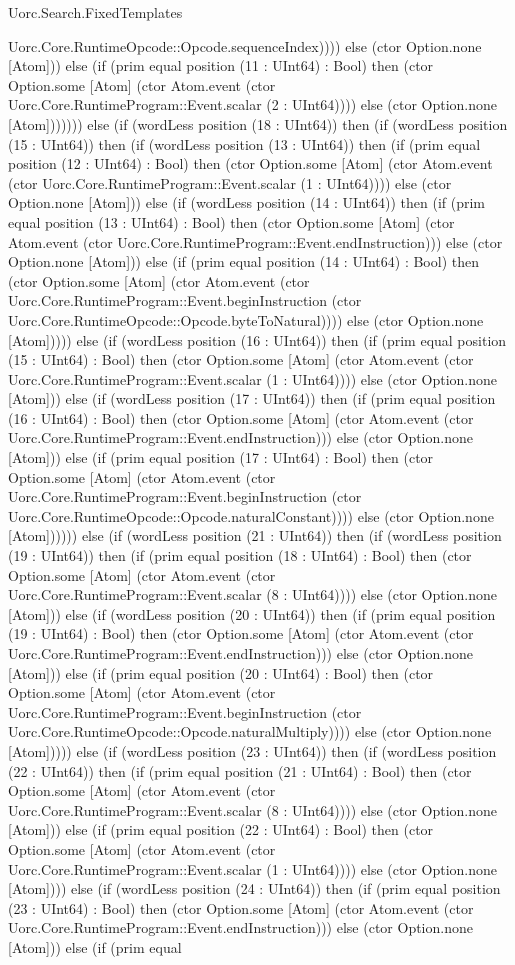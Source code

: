 \begin{lexlean}{Uorc.Search.FixedTemplates}
\begin{semanticmodule}
{Uorc.Core.RuntimeOpcode::Opcode.sequenceIndex)))) else (ctor Option.none [Atom])) else (if (prim equal position (11 : UInt64) : Bool) then (ctor Option.some [Atom] (ctor Atom.event (ctor Uorc.Core.RuntimeProgram::Event.scalar (2 : UInt64)))) else (ctor Option.none [Atom])))))) else (if (wordLess position (18 : UInt64)) then (if (wordLess position (15 : UInt64)) then (if (wordLess position (13 : UInt64)) then (if (prim equal position (12 : UInt64) : Bool) then (ctor Option.some [Atom] (ctor Atom.event (ctor Uorc.Core.RuntimeProgram::Event.scalar (1 : UInt64)))) else (ctor Option.none [Atom])) else (if (wordLess position (14 : UInt64)) then (if (prim equal position (13 : UInt64) : Bool) then (ctor Option.some [Atom] (ctor Atom.event (ctor Uorc.Core.RuntimeProgram::Event.endInstruction))) else (ctor Option.none [Atom])) else (if (prim equal position (14 : UInt64) : Bool) then (ctor Option.some [Atom] (ctor Atom.event (ctor Uorc.Core.RuntimeProgram::Event.beginInstruction (ctor Uorc.Core.RuntimeOpcode::Opcode.byteToNatural)))) else (ctor Option.none [Atom])))) else (if (wordLess position (16 : UInt64)) then (if (prim equal position (15 : UInt64) : Bool) then (ctor Option.some [Atom] (ctor Atom.event (ctor Uorc.Core.RuntimeProgram::Event.scalar (1 : UInt64)))) else (ctor Option.none [Atom])) else (if (wordLess position (17 : UInt64)) then (if (prim equal position (16 : UInt64) : Bool) then (ctor Option.some [Atom] (ctor Atom.event (ctor Uorc.Core.RuntimeProgram::Event.endInstruction))) else (ctor Option.none [Atom])) else (if (prim equal position (17 : UInt64) : Bool) then (ctor Option.some [Atom] (ctor Atom.event (ctor Uorc.Core.RuntimeProgram::Event.beginInstruction (ctor Uorc.Core.RuntimeOpcode::Opcode.naturalConstant)))) else (ctor Option.none [Atom]))))) else (if (wordLess position (21 : UInt64)) then (if (wordLess position (19 : UInt64)) then (if (prim equal position (18 : UInt64) : Bool) then (ctor Option.some [Atom] (ctor Atom.event (ctor Uorc.Core.RuntimeProgram::Event.scalar (8 : UInt64)))) else (ctor Option.none [Atom])) else (if (wordLess position (20 : UInt64)) then (if (prim equal position (19 : UInt64) : Bool) then (ctor Option.some [Atom] (ctor Atom.event (ctor Uorc.Core.RuntimeProgram::Event.endInstruction))) else (ctor Option.none [Atom])) else (if (prim equal position (20 : UInt64) : Bool) then (ctor Option.some [Atom] (ctor Atom.event (ctor Uorc.Core.RuntimeProgram::Event.beginInstruction (ctor Uorc.Core.RuntimeOpcode::Opcode.naturalMultiply)))) else (ctor Option.none [Atom])))) else (if (wordLess position (23 : UInt64)) then (if (wordLess position (22 : UInt64)) then (if (prim equal position (21 : UInt64) : Bool) then (ctor Option.some [Atom] (ctor Atom.event (ctor Uorc.Core.RuntimeProgram::Event.scalar (8 : UInt64)))) else (ctor Option.none [Atom])) else (if (prim equal position (22 : UInt64) : Bool) then (ctor Option.some [Atom] (ctor Atom.event (ctor Uorc.Core.RuntimeProgram::Event.scalar (1 : UInt64)))) else (ctor Option.none [Atom]))) else (if (wordLess position (24 : UInt64)) then (if (prim equal position (23 : UInt64) : Bool) then (ctor Option.some [Atom] (ctor Atom.event (ctor Uorc.Core.RuntimeProgram::Event.endInstruction))) else (ctor Option.none [Atom])) else (if (prim equal }
\end{semanticmodule}
\end{lexlean}
